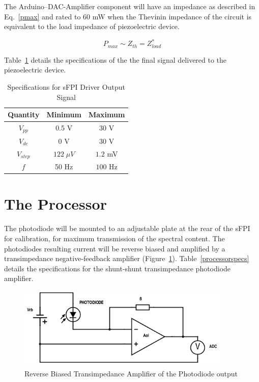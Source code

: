 \documentclass[12pt]{report}
\begin{document}
\noindent The Arduino--DAC-Amplifier component will have an impedance as described in Eq.~\ref{pmax} and rated to 60 mW when the Thevinin impedance of the circuit is equivalent to the load impedance of piezoelectric device.
 
\begin{equation}
P_{max} \sim Z_{th} = Z^*_{load}
\label{pmax}
\end{equation}

Table~\ref{finalsignal} details the specifications of the the final signal delivered to the piezoelectric device. 
\begin{table}[h!]
\begin{center}
\begin{tabular}{*3c}
\toprule 
  Quantity & Minimum & Maximum \\ 
  \midrule                   
  $V_{pp}$ & 0.5 V & $30$ V  \\
  $V_{dc}$ & 0 V & $30$ V  \\
  $V_{step}$ & $122\; \mu V$ & $1.2$ mV \\
  $f$ & 50 Hz & $100$ Hz  \\
  \bottomrule
\end{tabular}
\caption{Specifications for sFPI Driver Output Signal}
\label{finalsignal}
\end{center}
\end{table}
 
\section{The Processor}
The photodiode will be mounted to an adjustable plate at the rear of the sFPI for calibration, for maximum transmission of the spectral content. The photodiodes resulting current will be reverse biased and amplified by a transimpedance negative-feedback amplifier (Figure~\ref{fig:photodiode}). Table~\ref{processorspecs} details the specifications for the shunt-shunt transimpedance photodiode amplifier.

\begin{figure}[h!]
\centering
\includegraphics[width=4in]{photodiode_transimp_amp.png}
\caption[Photodiode Output Circuit]{Reverse Biased Transimpedance Amplifier of the Photodiode output}
\label{fig:photodiode}
\end{figure}
\end{document}
